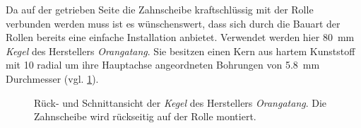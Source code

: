 		Da auf der getrieben Seite die Zahnscheibe kraftschlüssig mit der Rolle verbunden werden muss ist es wünschenswert, dass sich durch die Bauart der Rollen bereits eine einfache Installation anbietet.
		Verwendet werden hier \qty{80}{\milli\metre} \textit{Kegel} des Herstellers \textit{Orangatang}.
		Sie besitzen einen Kern aus hartem Kunststoff mit 10 radial um ihre Hauptachse angeordneten Bohrungen von \qty{5,8}{\milli\metre} Durchmesser (vgl. \cref{fig:kegels}).
		\begin{figure}[h]
			\centering
			
			\caption[Rück- und Schnittansicht der \textit{Kegel} des Herstellers \textit{Orangatang}]{Rück- und Schnittansicht der \textit{Kegel} des Herstellers \textit{Orangatang}. Die Zahnscheibe wird rückseitig auf der Rolle montiert.}
			\label{fig:kegels}
		\end{figure}

